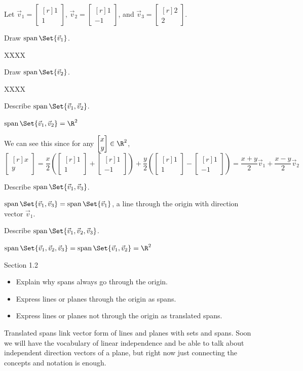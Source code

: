 \documentclass{problemset}
\DeclareMathOperator{\Span}{span}
\newcommand{\mat}[1]{\begin{bmatrix*}[r]#1\end{bmatrix*}}
\begin{document}
	\question
	Let $\vec v_1=\mat{1\\1}$, $\vec v_2=\mat{1\\-1}$, and $\vec v_3=\mat{2\\2}$.
	\begin{parts}
		\item Draw $\Span\Set{\vec v_1}$.
			\begin{solution}
				XXXX
			\end{solution}
		\item Draw $\Span\Set{\vec v_2}$.
			\begin{solution}
				XXXX
			\end{solution}
		\item Describe $\Span\Set{\vec v_1,\vec v_2}$.
			\begin{solution}
				$\Span\Set{\vec v_1,\vec v_2} = \R^2$

				We can see this since for any $\mat{x\\y} \in \R^2$,
				\[
					\mat{x\\y}
					=\frac{x}{2}\left(\mat{1\\1}+\mat{1\\-1}\right)+\frac{y}{2}\left(\mat{1\\1}-\mat{1\\-1}\right)
					=\frac{x+y}{2}\vec v_1 + \frac{x-y}{2}\vec v_2
				\]
			\end{solution}
		\item Describe $\Span\Set{\vec v_1,\vec v_3}$.
			\begin{solution}[inline]
				$\Span\Set{\vec v_1,\vec v_3} = \Span\Set{\vec v_1}$, 
				a line through the origin with direction vector $\vec v_1$. 
			\end{solution}
		\item Describe $\Span\Set{\vec v_1,\vec v_2,\vec v_3}$.
			\begin{solution}[inline]
				$\Span\Set{\vec v_1,\vec v_2,\vec v_3} = \Span\Set{\vec v_1,\vec v_2} = \R^2$
			\end{solution}
	\end{parts}


\begin{lesson}
	\newpage

	Section 1.2

	\begin{itemize}
		\item Explain why spans always go through the origin.
		\item Express lines or planes through the origin as spans.
		\item Express lines or planes not through the origin as translated spans.
	\end{itemize}

	Translated spans link vector form of lines and planes with sets and spans.
	Soon we will have the vocabulary of linear independence and be able to
	talk about independent direction vectors of a plane, but right now just connecting
	the concepts and notation is enough.

	\newpage
\end{lesson}
\end{document}
